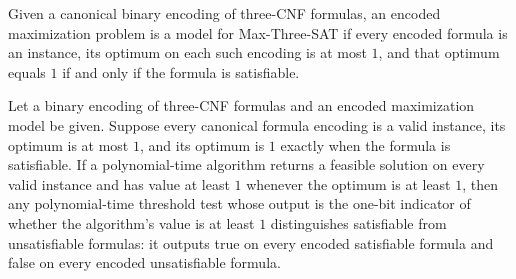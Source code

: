 \begin{definition}
\label{FABL.EncodedMaxThreeSatModel}
\leanok
{}
Given a canonical binary encoding of three-CNF formulas, an encoded maximization problem
is a model for Max-Three-SAT if every encoded formula is an instance, its optimum on
each such encoding is at most $1$, and that optimum equals $1$ if and only if the
formula is satisfiable.
\end{definition}

\begin{theorem}
\label{FABL.EncodedMaxThreeSatModel.distinguishesThreeCNFSat}
\leanok
{}
Let a binary encoding of three-CNF formulas and an encoded maximization model be given.
Suppose every canonical formula encoding is a valid instance, its optimum is at most
$1$, and its optimum is $1$ exactly when the formula is satisfiable. If a
polynomial-time algorithm returns a feasible solution on every valid instance and has
value at least $1$ whenever the optimum is at least $1$, then any polynomial-time
threshold test whose output is the one-bit indicator of whether the algorithm's value is
at least $1$ distinguishes satisfiable from unsatisfiable formulas: it outputs true on
every encoded satisfiable formula and false on every encoded unsatisfiable formula.
\end{theorem}

